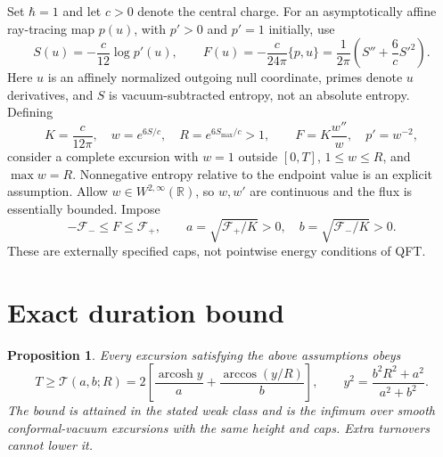 \documentclass[10pt]{article}
\newtheorem{proposition}{Proposition}
\newcommand{\arcosh}{\operatorname{arcosh}}
\newcommand{\R}{\mathbb R}
\begin{document}
Set $\hbar=1$ and let $c>0$ denote the central charge. For an asymptotically
affine ray-tracing map $p(u)$, with $p'>0$ and $p'=1$ initially, use
\begin{equation}
 S(u)=-\frac{c}{12}\log p'(u),\qquad
 F(u)=-\frac{c}{24\pi}\{p,u\}
 =\frac1{2\pi}\left(S''+\frac6c S'^2\right).
 \label{eq:BS}
\end{equation}
Here $u$ is an affinely normalized outgoing null coordinate, primes denote
$u$ derivatives, and $S$ is vacuum-subtracted entropy, not an absolute entropy.
Defining
\begin{equation}
 K=\frac{c}{12\pi},\quad w=e^{6S/c},\quad R=e^{6S_{\max}/c}>1,
 \qquad F=K\frac{w''}{w},\quad p'=w^{-2},
 \label{eq:w}
\end{equation}
consider a complete excursion with $w=1$ outside $[0,T]$, $1\le w\le R$,
and $\max w=R$. Nonnegative entropy relative to the endpoint value is an
explicit assumption. Allow $w\in W^{2,\infty}(\R)$, so $w,w'$ are continuous
and the flux is essentially bounded. Impose
\begin{equation}
 -\mathcal F_-\le F\le\mathcal F_+,\qquad
 a=\sqrt{\mathcal F_+/K}>0,\quad b=\sqrt{\mathcal F_-/K}>0.
 \label{eq:caps}
\end{equation}
These are externally specified caps, not pointwise energy conditions of QFT.

\section{Exact duration bound}

\begin{proposition}
Every excursion satisfying the above assumptions obeys
\begin{equation}
 \boxed{\ T\ge\mathcal T(a,b;R)
 =2\left[\frac{\arcosh y}{a}+\frac{\arccos(y/R)}{b}\right],\qquad
 y^2=\frac{b^2R^2+a^2}{a^2+b^2}.\ }
 \label{eq:bound}
\end{equation}
The bound is attained in the stated weak class and is the infimum over smooth
conformal-vacuum excursions with the same height and caps. Extra turnovers
cannot lower it.
\end{proposition}
\end{document}
